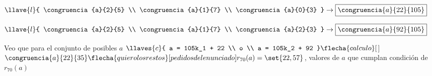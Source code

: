 \begin{minipage}{0.5\textwidth}
	\centering
	$
		\llave{l}{
			\congruencia{a}{2}{5} \\
			\congruencia{a}{1}{7} \\
			\congruencia{a}{0}{3}
		}
		\to \boxed{\congruencia{a}{22}{105} }
	$
\end{minipage}
\begin{minipage}{0.5\textwidth}
	\centering
	$\llave{l}{
			\congruencia{a}{2}{5} \\
			\congruencia{a}{1}{7} \\
			\congruencia{a}{2}{3}
		}
		\to \boxed{\congruencia{a}{92}{105} }
	$
\end{minipage}
Veo que para el conjunto de posibles $a$
$\llaves{c}{
		a = 105k_1 + 22 \\
		o \\
		a = 105k_2 + 92
	}\flecha{calculo}[$$]$
$\congruencia{a}{22}{35}\\
\flecha{quiero los restos}[pedidos del enunciado]
r_{70}(a) = \set{22, 57}$, 
valores de $a$ que cumplan condición de $r_{70}(a)$ \Tilde
